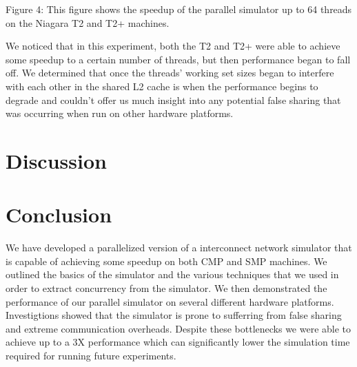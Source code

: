 \documentclass{article}
\begin{document}
\begin{multicols}{2}
\begin{center}
\small{Figure 4: This figure shows the speedup of the parallel simulator
up to 64 threads on the Niagara T2 and T2+ machines.}
\end{center}
We noticed that in this experiment, both the T2 and T2+ were able to
achieve some speedup to a certain number of threads, but then performance
began to fall off.  We determined that once the threads' working set sizes
began to interfere with each other in the shared L2 cache is when the
performance begins to degrade and couldn't offer us much insight into  any potential false sharing that was occurring when run on other
hardware platforms.

\section{Discussion \label{disc}}


\section{Conclusion \label{conc}}
We have developed a parallelized version of a interconnect network
simulator that is capable of achieving some speedup on both CMP and SMP
machines.  We outlined the basics of the simulator and the various
techniques that we used in order to extract concurrency from the
simulator.  We then demonstrated the performance of our parallel simulator
on several different hardware platforms.  Investigtions showed that the
simulator is prone to sufferring from false sharing and extreme
communication overheads.  Despite these bottlenecks we were able to
achieve up to a 3X performance which can significantly lower the
simulation time required for running future experiments.






\end{multicols}
\end{document}
